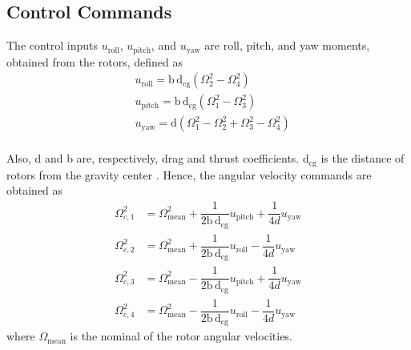 \documentclass[conference]{IEEEtran}
\begin{document}
\subsection{Control Commands}
\noindent The control inputs $u_{\text{roll}}$, $u_{\text{pitch}}$, and $u_{\text{yaw}}$ are roll, pitch, and yaw moments, obtained from the rotors, defined as
\begin{align}
		&u_{\text{roll}} = \mathrm{b\,d}_{\text{cg}} (\Omega_2^2 - \Omega_4^2)\\
	&u_{\text{pitch}} = \mathrm{b\,d}_{\text{cg}} (\Omega_1^2 - \Omega_3^2) \\
	&u_{\text{yaw}} = \mathrm{d} (\Omega_1^2 - \Omega_2^2 + \Omega_3^2 - \Omega_4^2)\\
\end{align}

Also, d and b are, respectively, drag and thrust coefficients. $\mathrm{d}_{\text{cg}}$ is the distance of rotors from the gravity center . Hence, the angular velocity commands are obtained as
\begin{align}
		\Omega_{c, 1}^2 &= \Omega_{\text{mean}}^2 + \dfrac{1}{2\mathrm{b\,d}_{\text{cg}}}u_{\text{pitch}} + \dfrac{1}{4d}u_{\text{yaw}} \\
	\Omega_{c, 2}^2 &= \Omega_{\text{mean}}^2 + \dfrac{1}{2\mathrm{b\,d}_{\text{cg}}}u_{\text{roll}} - \dfrac{1}{4d}u_{\text{yaw}}\\
	\Omega_{c, 3}^2 &= \Omega_{\text{mean}}^2 - \dfrac{1}{2\mathrm{b\,d}_{\text{cg}}}u_{\text{pitch}} + \dfrac{1}{4d}u_{\text{yaw}} \\
\Omega_{c, 4}^2 &= \Omega_{\text{mean}}^2 - \dfrac{1}{2\mathrm{b\,d}_{\text{cg}}}u_{\text{roll}} - \dfrac{1}{4d}u_{\text{yaw}}
\end{align}
where $\Omega_{\text{mean}}$ is the nominal of the rotor angular velocities.
\end{document}
